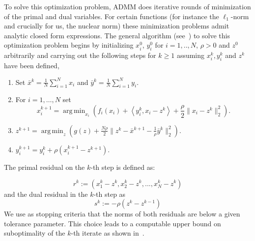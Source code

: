 \documentclass[12pt]{amsart}
\theoremstyle{remark}
\DeclareMathOperator*{\argmin}{arg\,min}
\begin{document}
To solve this optimization problem, ADMM does iterative rounds of minimization of the primal and dual variables. For certain functions (for instance the $\ell_1$-norm and crucially for us, the nuclear norm) these minimization problems admit analytic closed form expressions.  The general algorithm (see~\cite[pg. 52]{boyd2011distributed}) to solve this optimization problem begins by initializing $x^0_i$, $y^0_i$ for $i=1,..,N$, $\rho>0$ and $z^0$ arbitrarily and carrying out the following steps for $k\geq 1$ assuming $x_i^k,y_i^k$ and $z^k$ have been defined,
\begin{enumerate}
\item Set $ \bar{x}^{k} = \frac{1}{N}\sum_{i=1}^N x_i $ and $\bar{y}^{k} = \frac{1}{N}\sum_{i=1}^N y_i $.
\item For $i=1,\dots, N$ set
\[x_i^{k+1} = \argmin_{x_i} \left( f_i(x_i) + \left \langle y_i^k,x_i-z^k \right \rangle +\frac{\rho}{2}\|x_i-z^k\|_2^2\right ).\]

\item $z^{k+1} = \argmin_z \left (g(z)+\frac{N\rho}{2}\|z^k-\bar{x}^{k+1} -\frac{1}{\rho}\bar{y}^k \|_2^2 \right ).$
\item $y_i^{k+1} = y_i^k + \rho(x_i^{k+1}-z^{k+1}).$
\end{enumerate}


The primal residual on the $k$-th step is defined as: 

\[
r^k:=(x_1^k-z^k,x_2^k-z^k,...,x_N^k-z^k)
\]
and the dual residual in the $k$-th step as
\[
s^k:= -\rho(z^k-z^{k-1})
\]
We use as stopping criteria that the norms of both residuals are below a given tolerance parameter. This choice leads to a computable upper bound on suboptimality of the $k$-th iterate as shown in~\cite[Section 3.3]{boyd2011distributed}. 


\end{document}

